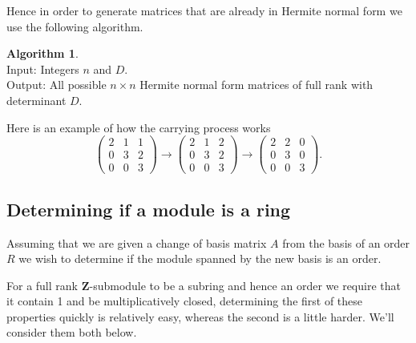 \documentclass[12pt,a4paper,abstracton,bibtotoc]{scrreprt}
\theoremstyle{definition}
\newtheorem{alg}{Algorithm}
\newcommand{\ZZ}{\mathbf{Z}}
\begin{document}
Hence in order to generate matrices that are already in Hermite normal form we use the following algorithm.

\begin{alg}~\\
Input: Integers $n$ and $D$.\\
Output: All possible $n\times n$ Hermite normal form matrices of full rank with determinant $D$.\\
\begin{algorithm}[H]
\end{algorithm}
\end{alg}

Here is an example of how the carrying process works
\[
\begin{pmatrix}
2& 1 &1\\
0& 3 &2\\
0& 0 &3
\end{pmatrix}
\to
\begin{pmatrix}
2& 1 &2\\
0& 3 &2\\
0& 0 &3
\end{pmatrix}
\to
\begin{pmatrix}
2& 2 &0\\
0& 3 &0\\
0& 0 &3
\end{pmatrix}.
\]

\subsection{Determining if a module is a ring}
Assuming that we are given a change of basis matrix $A$ from the basis of an order $R$ we wish to determine if the module spanned by the new basis is an order.

For a full rank $\ZZ$-submodule to be a subring and hence an order we require that it contain 1 and be multiplicatively closed, determining the first of these properties quickly is relatively easy, whereas the second is a little harder.
We'll consider them both below.
\end{document}
